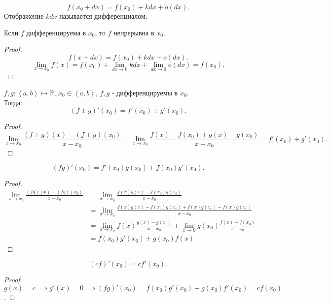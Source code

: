 \documentclass[11pt, oneside]{article}   	%
\begin{document}
      \begin{definition}
          \[ f(x_0+dx) = f(x_0) + kdx + o(dx) .\]
          Отображение $kdx$ называется дифференциалом.
      \end{definition}
      \begin{theorem}
          Если $f$ дифференцируема в $x_0$, то $f$ непрерывна в $x_0$.
          \begin{proof}
              \[ f(x+dx) = f(x_0) + kdx+o(dx) .\]
              \[ \lim\limits_{x \to x_0} f(x) = f(x_0) + \lim\limits_{dx \to 0} kdx + \lim\limits_{dx\to 0} o(dx) = f(x_0)  .\] 
          \end{proof}
      \end{theorem}
      \begin{theorem}
          $f,g: \left<a, b\right> \mapsto \mathbb{R}$, $x_0\in \left<a, b\right>$, $f,g$ - дифференцируемы в $x_0$.\\
          Тогда:
          \[ (f\pm g)'(x_0) = f'(x_0) \pm g'(x_0) .\]
          \begin{proof}
              \[ \lim\limits_{x \to x_0} \frac{(f\pm g)(x)-\left( f\pm g \right)(x_0) }{x-x_0} = \lim\limits_{x \to x_0} \frac{f(x)-f(x_0)+g(x)-g(x_0)}{x-x_0} = f'(x_0)+g'(x_0) .\] 
          \end{proof}
          \[ (fg)'(x_0) = f'(x_0)g(x_0) + f(x_0)g'(x_0) .\]
          \begin{proof}
              \begin{equation*}
                  \begin{split}
                      \lim\limits_{x \to x_0} \frac{(fg)(x)-(fg)(x_0)}{x-x_0} 
                      &= \lim\limits_{x \to x_0} \frac{f(x)g(x)-f(x_0)g(x_0)}{x-x_0}\\
                      &= \lim\limits_{x \to x_0} \frac{f(x)g(x)-f(x_0)g(x_0)+f(x)g(x_0)-f(x)g(x_0)}{x-x_0}\\
                      &= \lim\limits_{x \to x_0} f(x) \frac{g(x)-g(x_0)}{x-x_0} + \lim\limits_{x \to 0} g(x_0) \frac{f(x)-f(x_0)}{x-x_0}\\
                      &= f(x_0)g'(x_0)+g(x_0)f(x)
                  \end{split}
              \end{equation*}
          \end{proof}
          \[ (cf)'(x_0) = cf'(x_0) .\]
          \begin{proof}
              $g(x) = c \implies g'(x) = 0 \implies (fg)'(x_0) = f(x_0)g'(x_0)+g(x_0)f'(x_0)=cf(x_0)$.

\end{proof}
\end{theorem}
\end{document}
